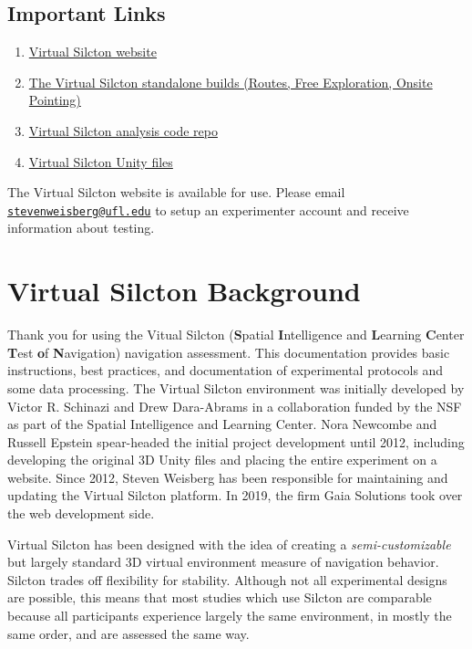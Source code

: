 \documentclass[
  12pt,
]{book}
\providecommand{\tightlist}{%
  \setlength{\itemsep}{0pt}\setlength{\parskip}{0pt}}
\begin{document}
\hypertarget{important-links}{%
\section{Important Links}\label{important-links}}

\begin{enumerate}
\def\labelenumi{\arabic{enumi}.}
\tightlist
\item
  \href{www.virtualsilcton.com}{Virtual Silcton website}
\item
  \href{https://osf.io/fykr7/}{The Virtual Silcton standalone builds (Routes, Free Exploration, Onsite Pointing)}
\item
  \href{https://github.com/smweis/Virtual_Silcton_Analysis}{Virtual Silcton analysis code repo}
\item
  \href{https://github.com/Scann-Lab/VirtualSilctonUnity}{Virtual Silcton Unity files}
\end{enumerate}

The Virtual Silcton website is available for use. Please email \href{mailto:stevenweisberg@ufl.edu}{\nolinkurl{stevenweisberg@ufl.edu}} to setup an experimenter account and receive information about testing.

\hypertarget{virtual-silcton-background}{%
\chapter{Virtual Silcton Background}\label{virtual-silcton-background}}

Thank you for using the Vitual Silcton (\textbf{S}patial \textbf{I}ntelligence and \textbf{L}earning \textbf{C}enter \textbf{T}est \textbf{o}f \textbf{N}avigation) navigation assessment. This documentation provides basic instructions, best practices, and documentation of experimental protocols and some data processing. The Virtual Silcton environment was initially developed by Victor R. Schinazi and Drew Dara-Abrams in a collaboration funded by the NSF as part of the Spatial Intelligence and Learning Center. Nora Newcombe and Russell Epstein spear-headed the initial project development until 2012, including developing the original 3D Unity files and placing the entire experiment on a website. Since 2012, Steven Weisberg has been responsible for maintaining and updating the Virtual Silcton platform. In 2019, the firm Gaia Solutions took over the web development side.

Virtual Silcton has been designed with the idea of creating a \emph{semi-customizable} but largely standard 3D virtual environment measure of navigation behavior. Silcton trades off flexibility for stability. Although not all experimental designs are possible, this means that most studies which use Silcton are comparable because all participants experience largely the same environment, in mostly the same order, and are assessed the same way.
\end{document}
